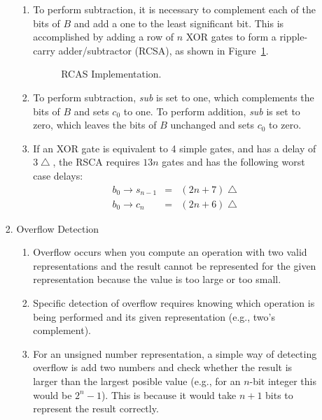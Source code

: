 \documentclass[times, twocolumn, 10pt]{article}
\begin{document}
\begin{enumerate}
\begin{enumerate}
\begin{enumerate}
      \begin{enumerate}
      \item To perform subtraction, it is necessary to complement each
        of the bits
	of $B$ and add a one to the least significant bit. This is accomplished
	by adding a row of $n$ XOR gates to form a ripple-carry
        adder/subtractor (RCSA), 
	as shown in Figure~\ref{rcas.fig}. 
	\begin{figure*} [t!]
	  \label{rcas.fig}
	  \begin{center}
	    \setlength{\unitlength}{0.0105in}%
	  \end{center}
	  \caption{RCAS Implementation.}
	\end{figure*}
      \item To perform subtraction, {\it sub} is set to one, which
        complements the bits 
	of $B$ and sets $c_{0}$ to one. To perform addition, {\it sub}
        is set to 
	zero, which leaves the bits of $B$ unchanged and sets $c_{0}$ to zero. 
      \item If an XOR gate is equivalent to 4 simple gates, and has a
        delay of $3 \bigtriangleup$,
	the RSCA requires $13n$ gates and has the following worst case delays: 
	\begin{eqnarray*}
	  b_{0} \rightarrow s_{n-1} & = & (2n + 7) \bigtriangleup \\
	  b_{0} \rightarrow c_{n} & = & (2n + 6) \bigtriangleup
	\end{eqnarray*}
      \end{enumerate}
    \item Overflow Detection
      \begin{enumerate}
      \item Overflow occurs when you compute an operation with two valid
        representations and the result cannot be represented for the
        given
        representation because the value is too large or too small.
      \item Specific detection of overflow requires knowing which
        operation is being performed and its given representation
        (e.g., two's complement).
        \item For an unsigned number representation, a simple way
          of detecting overflow is add two numbers and check whether
          the result is larger than the largest posible value (e.g.,
          for an $n$-bit integer this would be $2^n-1$).  This is
          because it would take $n+1$ bits to represent the result
          correctly.  

\end{enumerate}
\end{enumerate}
\end{enumerate}
\end{enumerate}
\end{document}
